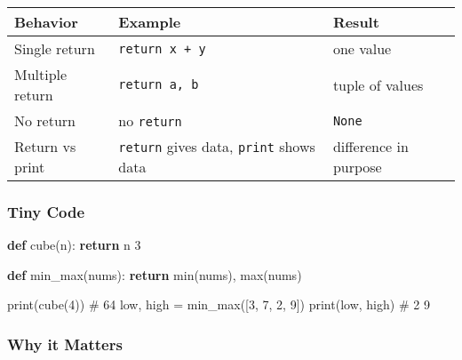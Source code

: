 \documentclass[
  letterpaper,
  DIV=11,
  numbers=noendperiod]{scrreprt}
\newenvironment{Shaded}{\begin{snugshade}}{\end{snugshade}}
\newcommand{\BuiltInTok}[1]{\textcolor[rgb]{0.00,0.23,0.31}{#1}}
\newcommand{\CommentTok}[1]{\textcolor[rgb]{0.37,0.37,0.37}{#1}}
\newcommand{\ControlFlowTok}[1]{\textcolor[rgb]{0.00,0.23,0.31}{\textbf{#1}}}
\newcommand{\DecValTok}[1]{\textcolor[rgb]{0.68,0.00,0.00}{#1}}
\newcommand{\KeywordTok}[1]{\textcolor[rgb]{0.00,0.23,0.31}{\textbf{#1}}}
\newcommand{\NormalTok}[1]{\textcolor[rgb]{0.00,0.23,0.31}{#1}}
\newcommand{\OperatorTok}[1]{\textcolor[rgb]{0.37,0.37,0.37}{#1}}
\begin{document}
\begin{longtable}[]{@{}
  >{\raggedright\arraybackslash}p{}
  >{\raggedright\arraybackslash}p{}
  >{\raggedright\arraybackslash}p{}@{}}
\toprule\noalign{}
\begin{minipage}[b]{\linewidth}\raggedright
Behavior
\end{minipage} & \begin{minipage}[b]{\linewidth}\raggedright
Example
\end{minipage} & \begin{minipage}[b]{\linewidth}\raggedright
Result
\end{minipage} \\
\midrule\noalign{}
\endhead
\bottomrule\noalign{}
\endlastfoot
Single return & \texttt{return\ x\ +\ y} & one value \\
Multiple return & \texttt{return\ a,\ b} & tuple of values \\
No return & no \texttt{return} & \texttt{None} \\
Return vs print & \texttt{return} gives data, \texttt{print} shows data
& difference in purpose \\
\end{longtable}

\subsubsection{Tiny Code}\label{tiny-code-33}

\begin{Shaded}
\begin{Highlighting}[]
\KeywordTok{def}\NormalTok{ cube(n):}
    \ControlFlowTok{return}\NormalTok{ n  }\DecValTok{3}

\KeywordTok{def}\NormalTok{ min\_max(nums):}
    \ControlFlowTok{return} \BuiltInTok{min}\NormalTok{(nums), }\BuiltInTok{max}\NormalTok{(nums)}

\BuiltInTok{print}\NormalTok{(cube(}\DecValTok{4}\NormalTok{))             }\CommentTok{\# 64}
\NormalTok{low, high }\OperatorTok{=}\NormalTok{ min\_max([}\DecValTok{3}\NormalTok{, }\DecValTok{7}\NormalTok{, }\DecValTok{2}\NormalTok{, }\DecValTok{9}\NormalTok{])}
\BuiltInTok{print}\NormalTok{(low, high)           }\CommentTok{\# 2 9}
\end{Highlighting}
\end{Shaded}

\subsubsection{Why it Matters}\label{why-it-matters-33}
\end{document}
